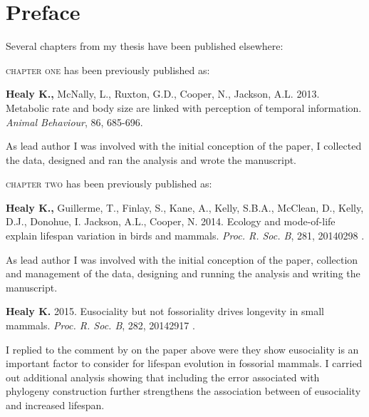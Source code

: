 \chapter*{Preface} %

Several chapters from my thesis have been published elsewhere:

\textsc{chapter one} has been previously published as:
%
\begin{previouspaper}
  \textbf{Healy K.,} McNally, L., Ruxton, G.D., Cooper, N., Jackson, A.L. 2013. Metabolic rate and body size are linked with perception of temporal information. \textit{Animal Behaviour}, 86, 685-696.
\end{previouspaper}
 
As lead author I was involved with the initial conception of the paper, I collected the data, designed and ran the analysis and wrote the manuscript.


{}
\textsc{chapter two} has been previously published as:
%
\begin{previouspaper}
  \textbf{Healy K.,} Guillerme, T., Finlay, S., Kane, A., Kelly, S.B.A., McClean, D., Kelly, D.J., Donohue, I. Jackson, A.L., Cooper, N. 2014. Ecology and mode-of-life explain lifespan variation in birds and mammals. \textit{Proc. R. Soc. B}, 281, 20140298 .
\end{previouspaper}

As lead author I was involved with the initial conception of the paper, collection and management of the data, designing and running the analysis and writing the manuscript.

\begin{previouspaper}
  \textbf{Healy K.} 2015. Eusociality but not fossoriality drives longevity in small mammals. \textit{Proc. R. Soc. B}, 282, 20142917 .
\end{previouspaper}

I replied to the comment by \cite{williams2015ecology} on the paper above were they show eusociality is an important factor to consider for lifespan evolution in fossorial mammals. I carried out additional analysis showing that including the error associated with phylogeny construction further strengthens the association between of eusociality and increased lifespan.


